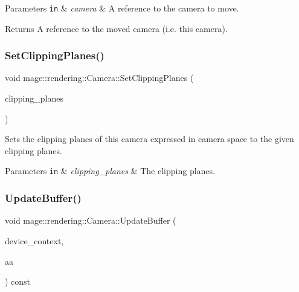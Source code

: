 \begin{DoxyParams}[1]{Parameters}
\mbox{\tt in}  & {\em camera} & A reference to the camera to move. \\
\hline
\end{DoxyParams}
\begin{DoxyReturn}{Returns}
A reference to the moved camera (i.\+e. this camera). 
\end{DoxyReturn}
\mbox{\label{classmage_1_1rendering_1_1_camera_afc95f8de701649af5b614a57c1c06e9a}} 
\subsubsection{\texorpdfstring{Set\+Clipping\+Planes()}{SetClippingPlanes()}}
{\footnotesize\ttfamily void mage\+::rendering\+::\+Camera\+::\+Set\+Clipping\+Planes (\begin{DoxyParamCaption}\item[{\mbox{\hyperlink{namespacemage_a9dc0d34d6ecc87e4cfa4a826102117bc}{F32x2}}}]{clipping\+\_\+planes }\end{DoxyParamCaption})\hspace{0.3cm}{\ttfamily [noexcept]}}

Sets the clipping planes of this camera expressed in camera space to the given clipping planes.


\begin{DoxyParams}[1]{Parameters}
\mbox{\tt in}  & {\em clipping\+\_\+planes} & The clipping planes. \\
\hline
\end{DoxyParams}
\mbox{\label{classmage_1_1rendering_1_1_camera_a82380790ba5c92b93e90c8b8cea146c0}} 
\subsubsection{\texorpdfstring{Update\+Buffer()}{UpdateBuffer()}}
{\footnotesize\ttfamily void mage\+::rendering\+::\+Camera\+::\+Update\+Buffer (\begin{DoxyParamCaption}\item[{I\+D3\+D11\+Device\+Context \&}]{device\+\_\+context,  }\item[{\mbox{\hyperlink{namespacemage_1_1rendering_ac3f75e49e92b42f2f5fb55c450d8899c}{Anti\+Aliasing}}}]{aa }\end{DoxyParamCaption}) const}

